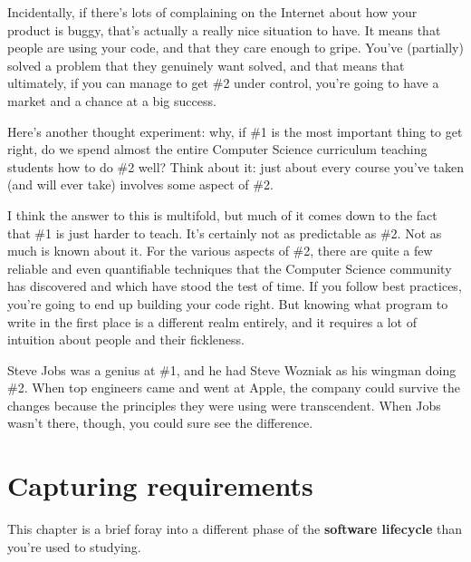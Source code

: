 Incidentally, if there's lots of complaining on the Internet about how your
product is buggy, that's actually a really nice situation to have. It means
that people are using your code, and that they care enough to gripe. You've
(partially) solved a problem that they genuinely want solved, and that means
that ultimately, if you can manage to get \#2 under control, you're going to
have a market and a chance at a big success.

Here's another thought experiment: why, if \#1 is the most important thing to
get right, do we spend almost the entire Computer Science curriculum teaching
students how to do \#2 well? Think about it: just about every course you've
taken (and will ever take) involves some aspect of \#2.

I think the answer to this is multifold, but much of it comes down to the fact
that \#1 is just harder to teach. It's certainly not as predictable as \#2.
Not as much is known about it. For the various aspects of \#2, there are quite
a few reliable and even quantifiable techniques that the Computer Science
community has discovered and which have stood the test of time. If you follow
best practices, you're going to end up building your code right. But knowing
what program to write in the first place is a different realm entirely, and it
requires a lot of intuition about people and their fickleness. 

Steve Jobs was a genius at \#1, and he had Steve Wozniak as his wingman doing
\#2. When top engineers came and went at Apple, the company could survive the
changes because the principles they were using were transcendent. When Jobs
wasn't there, though, you could sure see the difference.

\section{Capturing requirements}

This chapter is a brief foray into a different phase of the \textbf{software
lifecycle} than you're used to studying.



